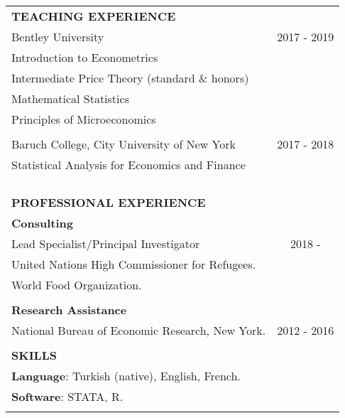 \documentclass[12 pt]{article}
\begin{document}
\begin{longtable}{ccccc}
\\


 \multicolumn{5}{l}{\textbf{TEACHING EXPERIENCE}}\\[2 pt] 
\multicolumn{4}{l}{Bentley University}  & \multicolumn{1}{c}{2017 - 2019} \\
 \multicolumn{4}{l}{Introduction to Econometrics}      \\
  \multicolumn{4}{l}{Intermediate Price Theory (standard \& honors)}    \\
 \multicolumn{4}{l}{Mathematical Statistics}      \\
\multicolumn{4}{l}{Principles of Microeconomics} \\

\\

\multicolumn{4}{l}{Baruch College, City University of New York}     & \multicolumn{1}{c}{2017 - 2018}     \\


\multicolumn{4}{l}{Statistical Analysis for Economics and Finance}        \\


\\
\\
\\
\\

\multicolumn{5}{l}{\textbf{PROFESSIONAL EXPERIENCE}}\\[2 pt] 
\multicolumn{4}{l}{\textbf{Consulting}} \\ 
\multicolumn{4}{l}{Lead Specialist/Principal Investigator}  & \multicolumn{1}{c}{2018 - \phantom{2016}}   \\
\multicolumn{4}{l}{United Nations High Commissioner for Refugees.}   \\
\multicolumn{4}{l}{World Food Organization.}   \\

\\
\multicolumn{4}{l}{\textbf{Research Assistance}} \\ 
\multicolumn{4}{l}{National Bureau of Economic Research, New York.} & \multicolumn{1}{c}{2012 - 2016}   \\
\\



\multicolumn{5}{l}{\textbf{SKILLS}}\\[2 pt]

 \multicolumn{4}{l}{\textbf{Language}: Turkish (native), English, French.}      \\
  \multicolumn{4}{l}{\textbf{Software}: STATA, R.}\\
 \\



\end{longtable}
\end{document}
